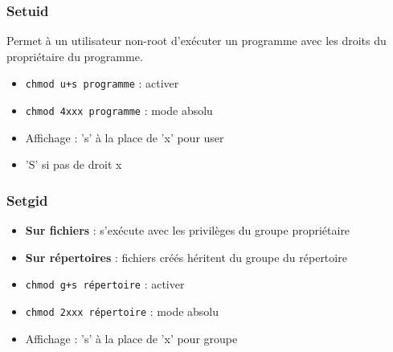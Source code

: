 \documentclass[12pt,a4paper]{article}
\begin{document}
\subsubsection{Setuid}
Permet \`a un utilisateur non-root d'ex\'ecuter un programme avec les droits du propri\'etaire du programme.
\begin{itemize}
    \item \texttt{chmod u+s programme} : activer %
    \item \texttt{chmod 4xxx programme} : mode absolu %
    \item Affichage : 's' \`a la place de 'x' pour user %
    \item 'S' si pas de droit x %
\end{itemize}


\subsubsection{Setgid}
\begin{itemize}
    \item \textbf{Sur fichiers} : s'ex\'ecute avec les privil\`eges du groupe propri\'etaire %
    \item \textbf{Sur r\'epertoires} : fichiers cr\'e\'es h\'eritent du groupe du r\'epertoire %
    \item \texttt{chmod g+s r\'epertoire} : activer %
    \item \texttt{chmod 2xxx r\'epertoire} : mode absolu %
    \item Affichage : 's' \`a la place de 'x' pour groupe %
\end{itemize}

\end{document}
